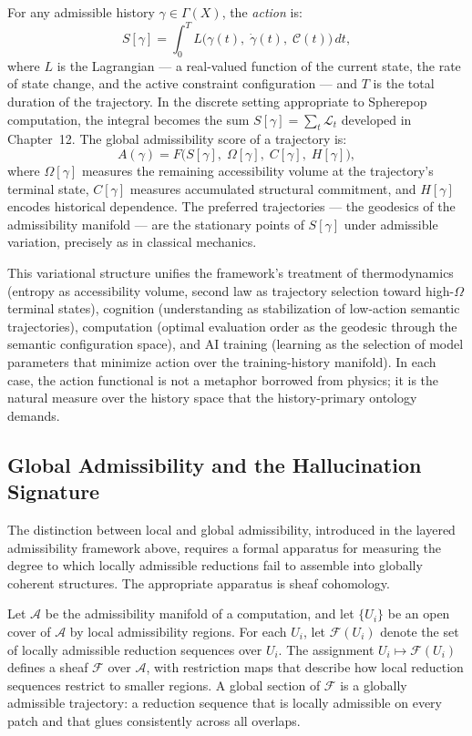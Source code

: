 \documentclass[12pt,openany]{book}
\theoremstyle{plain}
\theoremstyle{definition}
\theoremstyle{remark}
\begin{document}
For any admissible history $\gamma \in \Gamma(X)$, the \emph{action} is:
\[
  S[\gamma] = \int_0^T L\!\bigl(\gamma(t),\; \dot{\gamma}(t),\; \mathcal{C}(t)\bigr)\, dt,
\]
where $L$ is the Lagrangian — a real-valued function of the current state, the rate of state change, and the active constraint configuration — and $T$ is the total duration of the trajectory. In the discrete setting appropriate to Spherepop computation, the integral becomes the sum $S[\gamma] = \sum_t \mathcal{L}_t$ developed in Chapter~12. The global admissibility score of a trajectory is:
\[
  A(\gamma) = F\!\bigl(S[\gamma],\; \Omega[\gamma],\; C[\gamma],\; H[\gamma]\bigr),
\]
where $\Omega[\gamma]$ measures the remaining accessibility volume at the trajectory's terminal state, $C[\gamma]$ measures accumulated structural commitment, and $H[\gamma]$ encodes historical dependence. The preferred trajectories — the geodesics of the admissibility manifold — are the stationary points of $S[\gamma]$ under admissible variation, precisely as in classical mechanics.

This variational structure unifies the framework's treatment of thermodynamics (entropy as accessibility volume, second law as trajectory selection toward high-$\Omega$ terminal states), cognition (understanding as stabilization of low-action semantic trajectories), computation (optimal evaluation order as the geodesic through the semantic configuration space), and AI training (learning as the selection of model parameters that minimize action over the training-history manifold). In each case, the action functional is not a metaphor borrowed from physics; it is the natural measure over the history space that the history-primary ontology demands.

\subsection*{Global Admissibility and the Hallucination Signature}

The distinction between local and global admissibility, introduced in the layered admissibility framework above, requires a formal apparatus for measuring the degree to which locally admissible reductions fail to assemble into globally coherent structures. The appropriate apparatus is sheaf cohomology.

Let $\mathcal{A}$ be the admissibility manifold of a computation, and let $\{U_i\}$ be an open cover of $\mathcal{A}$ by local admissibility regions. For each $U_i$, let $\mathcal{F}(U_i)$ denote the set of locally admissible reduction sequences over $U_i$. The assignment $U_i \mapsto \mathcal{F}(U_i)$ defines a sheaf $\mathcal{F}$ over $\mathcal{A}$, with restriction maps that describe how local reduction sequences restrict to smaller regions. A global section of $\mathcal{F}$ is a globally admissible trajectory: a reduction sequence that is locally admissible on every patch and that glues consistently across all overlaps.
\end{document}
